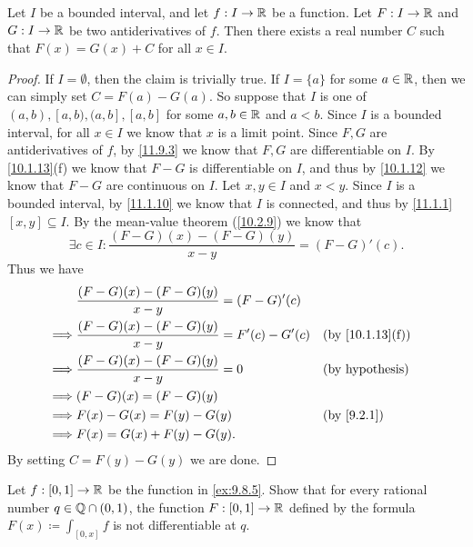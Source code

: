 \begin{lem}\label{11.9.5}
  Let \(I\) be a bounded interval, and let \(f : I \to \mathbb{R}\) be a function.
  Let \(F : I \to \mathbb{R}\) and \(G : I \to \mathbb{R}\) be two antiderivatives of \(f\).
  Then there exists a real number \(C\) such that \(F(x) = G(x) + C\) for all \(x \in I\).
\end{lem}

\begin{proof}
  If \(I = \emptyset\), then the claim is trivially true.
  If \(I = \{a\}\) for some \(a \in \mathbb{R}\), then we can simply set \(C = F(a) - G(a)\).
  So suppose that \(I\) is one of \((a, b), [a, b), (a, b], [a, b]\) for some \(a, b \in \mathbb{R}\) and \(a < b\).
  Since \(I\) is a bounded interval, for all \(x \in I\) we know that \(x\) is a limit point.
  Since \(F, G\) are antiderivatives of \(f\), by \cref{11.9.3} we know that \(F, G\) are differentiable on \(I\).
  By \cref{10.1.13}(f) we know that \(F - G\) is differentiable on \(I\), and thus by \cref{10.1.12} we know that \(F - G\) are continuous on \(I\).
  Let \(x, y \in I\) and \(x < y\).
  Since \(I\) is a bounded interval, by \cref{11.1.10} we know that \(I\) is connected, and thus by \cref{11.1.1} \([x, y] \subseteq I\).
  By the mean-value theorem (\cref{10.2.9}) we know that
  \[
    \exists c \in I : \dfrac{(F - G)(x) - (F - G)(y)}{x - y} = (F - G)'(c).
  \]
  Thus we have
  \begin{align*}
             & \dfrac{(F - G)(x) - (F - G)(y)}{x - y} = (F - G)'(c)                                      \\
    \implies & \dfrac{(F - G)(x) - (F - G)(y)}{x - y} = F'(c) - G'(c) &  & \text{(by \cref{10.1.13}(f))} \\
    \implies & \dfrac{(F - G)(x) - (F - G)(y)}{x - y} = 0             &  & \text{(by hypothesis)}        \\
    \implies & (F - G)(x) = (F - G)(y)                                                                   \\
    \implies & F(x) - G(x) = F(y) - G(y)                              &  & \by{9.2.1}                    \\
    \implies & F(x) = G(x) + F(y) - G(y).
  \end{align*}
  By setting \(C = F(y) - G(y)\) we are done.
\end{proof}

\exercisesection

\begin{ex}\label{ex:11.9.1}
  Let \(f : [0, 1] \to \mathbb{R}\) be the function in \cref{ex:9.8.5}.
  Show that for every rational number \(q \in \mathbb{Q} \cap (0, 1)\), the function \(F : [0, 1] \to \mathbb{R}\) defined by the formula \(F(x) \coloneqq \int_{[0, x]} f\) is not differentiable at \(q\).
\end{ex}

